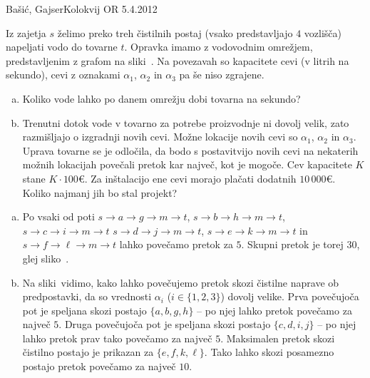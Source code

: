 \begin{naloga}{Bašić, Gajser}{Kolokvij OR 5.4.2012}
\begin{vprasanje}
Iz zajetja $s$ želimo preko treh čistilnih postaj
(vsako predstavljajo $4$ vozlišča)
napeljati vodo do tovarne $t$.
Opravka imamo z vodovodnim omrežjem,
pred\-stav\-lje\-nim z grafom na sliki~\fig.
Na povezavah so kapacitete cevi (v litrih na sekundo),
cevi z oznakami $\alpha_1$, $\alpha_2$ in $\alpha_3$ pa še niso zgrajene.

\begin{enumerate}[(a)]
\item Koliko vode lahko po danem omrežju dobi tovarna na sekundo?

\item Trenutni dotok vode v tovarno za potrebe proizvodnje ni dovolj velik,
zato razmišljajo o izgradnji novih cevi.
Možne lokacije novih cevi so $\alpha_1$, $\alpha_2$ in $\alpha_3$.
Uprava tovarne se je odločila,
da bodo s postavitvijo novih cevi na nekaterih možnih lokacijah
povečali pretok kar največ, kot je mogoče.
Cev kapacitete $K$ stane $K \cdot 100 €$.
Za inštalacijo ene cevi morajo plačati dodatnih $10\,000 €$.
Koliko najmanj jih bo stal projekt?
\end{enumerate}

\begin{slika}
\makebox[\textwidth][c]{
\pgfslika
}
\end{slika}
\end{vprasanje}

\begin{odgovor}
\begin{enumerate}[(a)]
\item Po vsaki od poti $s \to a \to g \to m \to t$,
$s \to b \to h \to m \to t$, $s \to c \to i \to m \to t$
$s \to d \to j \to m \to t$, $s \to e \to k \to m \to t$
in $s \to f \to \ell \to m \to t$ lahko povečamo pretok za $5$.
Skupni pretok je torej $30$, glej sliko~.

\item Na sliki~ vidimo,
kako lahko povečujemo pretok skozi čistilne naprave ob predpostavki,
da so vrednosti $\alpha_i$ ($i \in \{1, 2, 3\}$) dovolj velike.
Prva povečujoča pot je speljana skozi postajo $\{a, b, g, h\}$
-- po njej lahko pretok povečamo za največ $5$.
Druga povečujoča pot je speljana skozi postajo $\{c, d, i, j\}$
-- po njej lahko pretok prav tako povečamo za največ $5$.
Maksimalen pretok skozi čistilno postajo je prikazan za $\{e, f, k, \ell\}$.
Tako lahko skozi posamezno postajo pretok povečamo za največ $10$.


\end{enumerate}
\end{odgovor}
\end{naloga}
